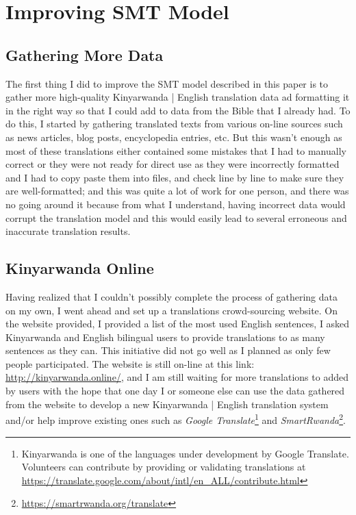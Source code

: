 \chapter{Improving SMT Model}
\section{Gathering More Data} %
The first thing I did to improve the SMT model described in this paper is to gather more high-quality Kinyarwanda | English translation data ad formatting it in the right way so that I could add to data from the Bible that I already had. To do this, I started by gathering translated texts from various on-line sources such as news articles, blog posts, encyclopedia entries, etc. But this wasn't enough as most of these translations either contained some mistakes that I had to manually correct or they were not ready for direct use as they were incorrectly formatted and I had to copy paste them into files, and check line by line to make sure they are well-formatted; and this was quite a lot of work for one person, and there was no going around it because from what I understand, having incorrect data would corrupt the translation model and this would easily lead to several erroneous and inaccurate translation results. 
\section{Kinyarwanda Online}
Having realized that I couldn't possibly complete the process of gathering data on my own, I went ahead and set up a translations crowd-sourcing website. On the website provided, I provided a list of the most used English sentences, I asked Kinyarwanda and English bilingual users to provide translations to as many sentences as they can. This initiative did not go well as I planned as only few people participated. The website is still on-line at this link:  \url{http://kinyarwanda.online/}, and I am still waiting for more translations to added by users with the hope that one day I or someone else can use the data gathered from the website to develop a new Kinyarwanda | English translation system and/or help improve existing ones such as \textit{Google Translate}\footnote{Kinyarwanda is one of the languages under development by Google Translate. Volunteers can contribute by providing or validating translations at \url{https://translate.google.com/about/intl/en_ALL/contribute.html}} and \textit{SmartRwanda}\footnote{\url{https://smartrwanda.org/translate}}.

